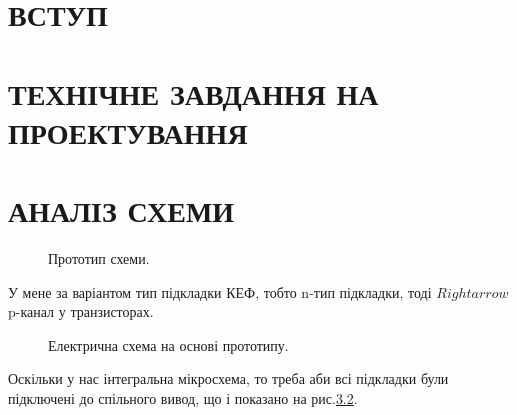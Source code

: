 \documentclass[a4paper,14pt]{extreport}
\begin{document}
\newpage
\setcounter{page}{1}
\tableofcontents

\newpage
\setcounter{page}{1}

\newpage
\chapter{ВСТУП}

\newpage
\chapter{ТЕХНІЧНЕ ЗАВДАННЯ НА ПРОЕКТУВАННЯ}

\newpage
\chapter{АНАЛІЗ СХЕМИ}
	\begin{figure}[h!]
	\caption{Прототип схеми.}
	\label{ris1}
	\end{figure}
	У мене за варіантом тип підкладки КЕФ, тобто n-тип підкладки, тоді $Rightarrow$ p-канал у транзисторах.

	\begin{figure}[h!]
	\caption{Електрична схема на основі прототипу.}
	\label{ris2}
	\end{figure}
	Оскільки у нас інтегральна мікросхема, то треба аби всі підкладки були підключені до спільного вивод, що і показано на рис.\ref{ris2}.\\
\end{document}
